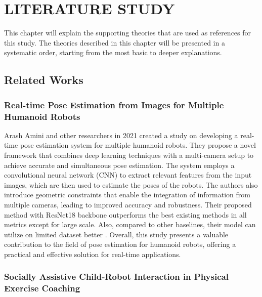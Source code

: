 \chapter{LITERATURE STUDY}
\label{chap:literaturestudy}


This chapter will explain the supporting theories that are used as references for this study.
The theories described in this chapter will be presented in a systematic order, starting from the most basic
to deeper explanations.

\section{Related Works}
\label{sec:related-works}

\subsection{Real-time Pose Estimation from Images for Multiple Humanoid Robots}
\label{subsec:real-time-multiple-robots}

Arash Amini and other researchers in 2021 created a study on developing a real-time pose estimation system for multiple humanoid robots. 
They propose a novel framework that combines deep learning techniques with a multi-camera setup to achieve accurate and simultaneous pose estimation. 
The system employs a convolutional neural network (CNN) to extract relevant features from the input images, which are then used to estimate the poses of the robots.
The authors also introduce geometric constraints that enable the integration of information from multiple cameras, leading to improved accuracy and robustness.
Their proposed method with ResNet18 backbone outperforms the best existing methods in all metrics except for large scale.
Also, compared to other baselines, their model can utilize on limited dataset better \parencite{amini2021}. Overall, this study presents a valuable contribution to the field of pose estimation for humanoid robots, offering a practical and effective solution for real-time applications.

\subsection{Socially Assistive Child-Robot Interaction in Physical Exercise Coaching}
\label{subsec:sars-for-child}

